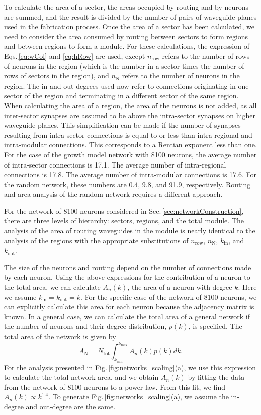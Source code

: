 \documentclass[twocolumn]{article}
\begin{document}
To calculate the area of a sector, the areas occupied by routing and by neurons are summed, and the result is divided by the number of pairs of waveguide planes used in the fabrication process. Once the area of a sector has been calculated, we need to consider the area consumed by routing between sectors to form regions and between regions to form a module. For these calculations, the expression of Eqs.\,\ref{eq:wCol} and \ref{eq:hRow} are used, except $n_{\mathrm{row}}$ refers to the number of rows of neurons in the region (which is the number in a sector times the number of rows of sectors in the region), and $n_{\mathrm{N}}$ refers to the number of neurons in the region. The in and out degrees used now refer to connections originating in one sector of the region and terminating in a different sector of the same region. When calculating the area of a region, the area of the neurons is not added, as all inter-sector synapses are assumed to be above the intra-sector synapses on higher waveguide planes. This simplification can be made if the number of synapses resulting from intra-sector connections is equal to or less than intra-regional and intra-modular connections. This corresponds to a Rentian exponent less than one. For the case of the growth model network with 8100 neurons, the average number of intra-sector connections is 17.1. The average number of intra-regional connections is 17.8. The average number of intra-modular connections is 17.6. For the random network, these numbers are 0.4, 9.8, and 91.9, respectively. Routing and area analysis of the random network requires a different approach.

For the network of 8100 neurons considered in Sec.\,\ref{sec:networkConstruction}, there are three levels of hierarchy: sectors, regions, and the total module. The analysis of the area of routing waveguides in the module is nearly identical to the analysis of the regions with the appropriate substitutions of $n_{\mathrm{row}}$, $n_{\mathrm{N}}$, $k_{\mathrm{in}}$, and $k_{\mathrm{out}}$.

The size of the neurons and routing depend on the number of connections made by each neuron. Using the above expressions for the contribution of a neuron to the total area, we can calculate $A_n(k)$, the area of a neuron with degree $k$. Here we assume $k_{\mathrm{in}} = k_{\mathrm{out}} = k$. For the specific case of the network of 8100 neurons, we can explicitly calculate this area for each neuron because the adjacency matrix is known. In a general case, we can calculate the total area of a general network if the number of neurons and their degree distribution, $p(k)$, is specified. The total area of the network is given by
\begin{equation}
\label{eq:networkArea}
A_{\mathrm{N}} = N_{\mathrm{tot}}\int_{k_{\mathrm{min}}}^{k_{\mathrm{max}}}A_n(k)p(k)dk.
\end{equation}
For the analysis presented in Fig.\,\ref{fig:networks_scaling}(a), we use this expression to calculate the total network area, and we obtain $A_n(k)$ by fitting the data from the network of 8100 neurons to a power law. From this fit, we find $A_n(k)\propto k^{1.4}$. To generate Fig.\,\ref{fig:networks_scaling}(a), we assume the in-degree and out-degree are the same. 
\end{document}
